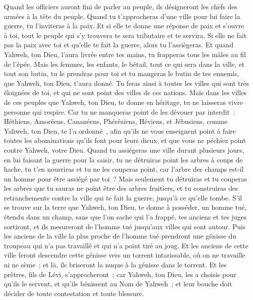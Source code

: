 \begin{multicols}{2}
Quand les officiers auront fini de parler au peuple, ils désigneront les chefs des armées à la tête du peuple.
Quand tu t'approcheras d'une ville pour lui faire la guerre, tu l'inviteras à la paix.
Et si elle te donne une réponse de paix et s'ouvre à toi, tout le peuple qui s'y trouvera te sera tributaire et te servira.
Si elle ne fait pas la paix avec toi et qu'elle te fait la guerre, alors tu l'assiègeras.
Et quand Yahweh, ton Dieu, l'aura livrée entre tes mains, tu frapperas tous les mâles au fil de l'épée.
Mais les femmes, les enfants, le bétail, tout ce qui sera dans la ville, et tout son butin, tu le prendras pour toi et tu mangeras le butin de tes ennemis, que Yahweh, ton Dieu, t'aura donné.
Tu feras ainsi à toutes les villes qui sont très éloignées de toi, et qui ne sont point des villes de ces nations.
Mais dans les villes de ces peuples que Yahweh, ton Dieu, te donne en héritage, tu ne laisseras vivre personne qui respire.
Car tu ne manqueras point de les dévouer par interdit~: Héthiens, Amoréens, Cananéens, Phéréziens, Héviens, et Jébusiens, comme Yahweh, ton Dieu, te l'a ordonné~,
afin qu'ils ne vous enseignent point à faire toutes les abominations qu'ils font pour leurs dieux, et que vous ne péchiez point contre Yahweh, votre Dieu.
Quand tu assiégeras une ville durant plusieurs jours, en lui faisant la guerre pour la saisir, tu ne détruiras point les arbres à coups de hache, tu t'en nourriras et tu ne les couperas point, car l'arbre des champs est-il un homme pour être assiégé par toi~?
Mais seulement tu détruiras et tu couperas les arbres que tu sauras ne point être des arbres fruitiers, et tu construiras des retranchements contre la ville qui te fait la guerre, jusqu'à ce qu'elle tombe.
\VerseOne{}S'il se trouve sur la terre que Yahweh, ton Dieu, te donne à posséder, un homme tué, étendu dans un champ, sans que l'on sache qui l'a frappé,
tes anciens et tes juges sortiront, et ils mesureront de l'homme tué jusqu'aux villes qui sont autour.
Puis les anciens de la ville la plus proche de l'homme tué prendront une génisse du troupeau qui n'a pas travaillé et qui n'a point tiré au joug.
Et les anciens de cette ville feront descendre cette génisse vers un torrent intarissable, où on ne travaille ni ne sème~; et là, ils briseront la nuque à la génisse dans le torrent.
Et les prêtres, fils de Lévi, s'approcheront~; car Yahweh, ton Dieu, les a choisis pour qu'ils le servent, et qu'ils bénissent au Nom de Yahweh~; et leur bouche doit décider de toute contestation et toute blessure.

\end{multicols}
